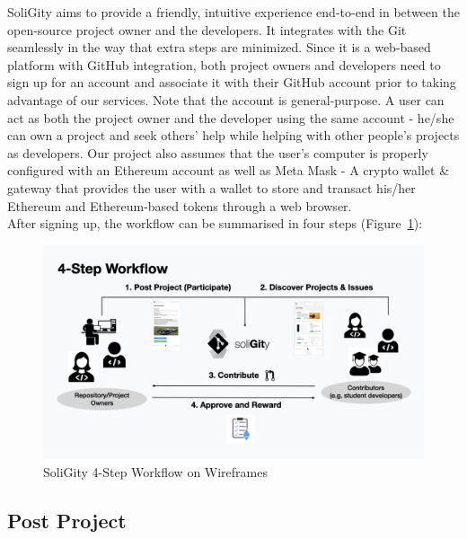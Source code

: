 \documentclass[12pt]{article}
\renewcommand{\_}{\kern-1.5pt\textunderscore\kern-1.5pt}
\begin{document}
SoliGity aims to provide a friendly, intuitive experience end-to-end in between the open-source project owner
and the developers. It integrates with the Git seamlessly in the way that extra steps are minimized. Since it
is a web-based platform with GitHub integration, both project owners and developers need to sign up for an
account and associate it with their GitHub account prior to taking advantage of our services. Note that the
account is general-purpose. A user can act as both the project owner and the developer using the same account
- he/she can own a project and seek others’ help while helping with other people’s projects as developers.
Our project also assumes that the user’s computer is properly configured with an Ethereum account as well as
Meta Mask - A crypto wallet \& gateway that provides the user with a wallet to store and transact his/her
Ethereum and Ethereum-based tokens through a web browser. \\

\noindent After signing up, the workflow can be summarised in four steps (Figure~\ref{fig:workflow1}):

\begin{figure}[H]
	\centering
	\includegraphics[width=13.5cm]{graphs/00a. workflow.jpeg}
	\caption{SoliGity 4-Step Workflow on Wireframes}
	\label{fig:workflow1}
\end{figure}



\renewcommand\thesubsection{Step \arabic{subsection}.}
\renewcommand\thesubsubsection{\arabic{subsubsection}.}

\subsection{Post Project}
\end{document}

